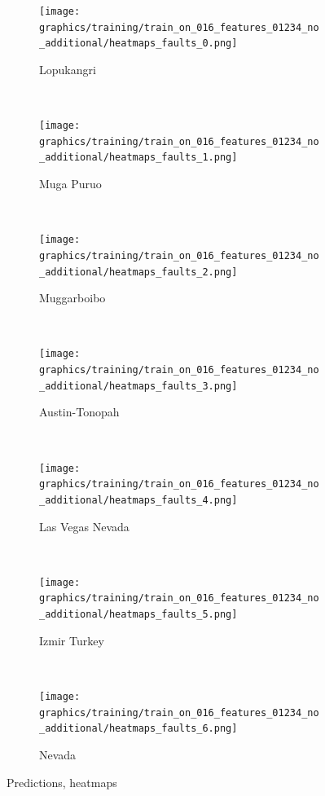 \documentclass[11pt,a4paper]{article}
\begin{document}
\begin{figure}[t]
    \centering
    \begin{subfigure}[b]{0.12\textwidth}
        \texttt{[image: graphics/training/train\_on\_016\_features\_01234\_no\_additional/heatmaps\_faults\_0.png]}
        \caption{Lopukangri}
        \label{fig:heatmaps_1_Lopukangri}
    \end{subfigure}
    ~
    \begin{subfigure}[b]{0.12\textwidth}
        \texttt{[image: graphics/training/train\_on\_016\_features\_01234\_no\_additional/heatmaps\_faults\_1.png]}
        \caption{Muga Puruo}
        \label{fig:heatmaps_1_Muga_Puruo}
    \end{subfigure}
    ~
    \begin{subfigure}[b]{0.12\textwidth}
        \texttt{[image: graphics/training/train\_on\_016\_features\_01234\_no\_additional/heatmaps\_faults\_2.png]}
        \caption{Muggarboibo}
        \label{fig:heatmaps_1_Muggarboibo}
    \end{subfigure}
    ~
    \begin{subfigure}[b]{0.12\textwidth}
        \texttt{[image: graphics/training/train\_on\_016\_features\_01234\_no\_additional/heatmaps\_faults\_3.png]}
        \caption{Austin-Tonopah}
        \label{fig:heatmaps_1_Austin-Tonopah}
    \end{subfigure}
    ~
    \begin{subfigure}[b]{0.12\textwidth}
        \texttt{[image: graphics/training/train\_on\_016\_features\_01234\_no\_additional/heatmaps\_faults\_4.png]}
        \caption{Las Vegas Nevada}
        \label{fig:heatmaps_1_Las_Vegas_Nevada}
    \end{subfigure}
    ~
    \begin{subfigure}[b]{0.12\textwidth}
        \texttt{[image: graphics/training/train\_on\_016\_features\_01234\_no\_additional/heatmaps\_faults\_5.png]}
        \caption{Izmir Turkey}
        \label{fig:heatmaps_1_Izmir_Turkey}
    \end{subfigure}
    ~
    \begin{subfigure}[b]{0.12\textwidth}
        \texttt{[image: graphics/training/train\_on\_016\_features\_01234\_no\_additional/heatmaps\_faults\_6.png]}
        \caption{Nevada}
        \label{fig:heatmaps_1_Nevada}
    \end{subfigure}

    \caption{Predictions, heatmaps}\label{fig:train_on_016_features_01234_no_additional_im}
\end{figure}
\end{document}
